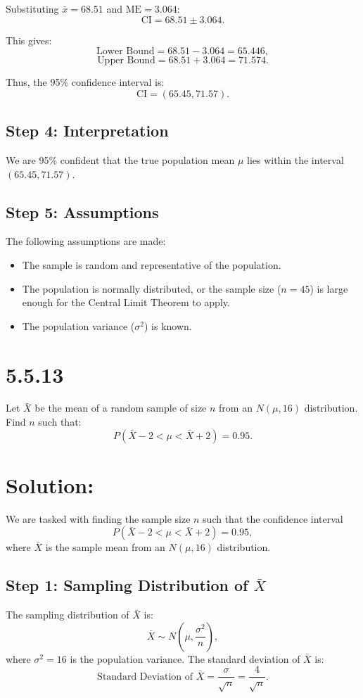 \documentclass{article}
\begin{document}
Substituting \(\bar{x} = 68.51\) and \(\text{ME} = 3.064\):
\[
\text{CI} = 68.51 \pm 3.064.
\]

This gives:
\[
\text{Lower Bound} = 68.51 - 3.064 = 65.446,
\]
\[
\text{Upper Bound} = 68.51 + 3.064 = 71.574.
\]

Thus, the 95\% confidence interval is:
\[
\text{CI} = (65.45, 71.57).
\]

\subsection*{Step 4: Interpretation}
We are 95\% confident that the true population mean \(\mu\) lies within the interval \((65.45, 71.57)\).

\subsection*{Step 5: Assumptions}
The following assumptions are made:
\begin{itemize}
    \item The sample is random and representative of the population.
    \item The population is normally distributed, or the sample size (\(n = 45\)) is large enough for the Central Limit Theorem to apply.
    \item The population variance (\(\sigma^2\)) is known.
\end{itemize}

\section*{5.5.13}

Let $\bar{X}$ be the mean of a random sample of size $n$ from an $N(\mu, 16)$ distribution. Find $n$ such that:
\[
P(\bar{X} - 2 < \mu < \bar{X} + 2) = 0.95.
\]

\section*{Solution:}


We are tasked with finding the sample size \(n\) such that the confidence interval 
\[
P(\bar{X} - 2 < \mu < \bar{X} + 2) = 0.95,
\]
where \(\bar{X}\) is the sample mean from an \(N(\mu, 16)\) distribution.

\subsection*{Step 1: Sampling Distribution of \(\bar{X}\)}
The sampling distribution of \(\bar{X}\) is:
\[
\bar{X} \sim N\left(\mu, \frac{\sigma^2}{n}\right),
\]
where \(\sigma^2 = 16\) is the population variance. The standard deviation of \(\bar{X}\) is:
\[
\text{Standard Deviation of } \bar{X} = \frac{\sigma}{\sqrt{n}} = \frac{4}{\sqrt{n}}.
\]
\end{document}
